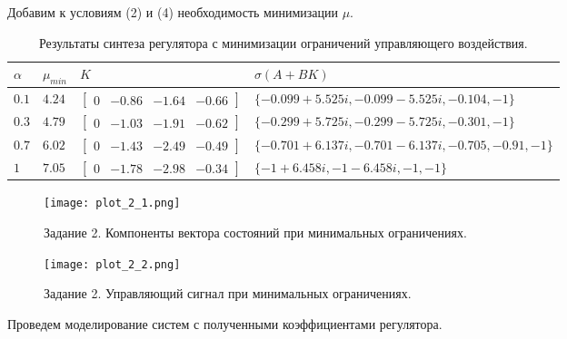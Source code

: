 Добавим к условиям (2) и (4) необходимость минимизации $\mu$.
\begin{table}[h!]
    \centering
    \begin{tabular}{| l | l | l | l |} 
        \hline
        $\alpha$ & $\mu_{min}$ & $K$ & $\sigma(A+BK)$  \\  
        \hline\hline
        $0.1$ & $4.24$ & $\begin{bmatrix} 0 & -0.86 & -1.64 & -0.66\end{bmatrix}$ & $\{-0.099+5.525i, -0.099-5.525i, -0.104  , -1\}$ \\ 
        \hline
        $0.3$ & $4.79$ & $\begin{bmatrix} 0 & -1.03 & -1.91 & -0.62\end{bmatrix}$ & $\{-0.299+5.725i, -0.299-5.725i, -0.301  , -1\}$ \\
        \hline
        $0.7$ & $6.02$ & $\begin{bmatrix} 0 & -1.43 & -2.49 & -0.49\end{bmatrix}$ & $\{-0.701+6.137i, -0.701-6.137i, -0.705, -0.91 , -1\}$ \\
        \hline
        $1$ & $7.05$ & $\begin{bmatrix} 0 & -1.78 & -2.98 & -0.34 \end{bmatrix}$ & $\{-1+6.458i, -1-6.458i, -1 , -1\}$ \\
        \hline
       \end{tabular}
    \caption{Результаты синтеза регулятора с минимизации ограничений управляющего воздействия.}
    \label{table:3}
\end{table}
\begin{figure}[]
    \centering
    \texttt{[image: plot\_2\_1.png]}
    \caption{\label{fig:The-caption-1}Задание 2. Компоненты вектора состояний при минимальных ограничениях.}
\end{figure}
\begin{figure}[]
    \centering
    \texttt{[image: plot\_2\_2.png]}
    \caption{\label{fig:The-caption-1}Задание 2. Управляющий сигнал при минимальных ограничениях.}
\end{figure}

Проведем моделирование систем с полученными коэффициентами регулятора.
\pagebreak


